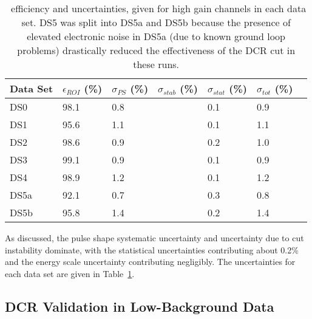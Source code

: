 \begin{table}[]
\centering
\begin{tabular}{l l l l l l l}
Data Set & $\epsilon_{ROI}$ (\%) & $\sigma_{PS}$ (\%) & $\sigma_{stab}$  (\%) & $\sigma_{stat}$  (\%) &$\sigma_{tot}$ (\%) \\ 
\hline
DS0  & 98.1  &  0.8  &    &  0.1  &  0.9 \\   
DS1  & 95.6  &  1.1  &    &  0.1  &  1.1 \\
DS2  & 98.6  &  0.9  &    &  0.2  &  1.0 \\
DS3  & 99.1  &  0.9  &    &  0.1  &  0.9 \\
DS4  & 98.9  &  1.2  &    &  0.1  &  1.2 \\
DS5a  & 92.1  &  0.7  &    &  0.3  &  0.8 \\
DS5b  & 95.8  &  1.4  &    &  0.2  &  1.4 \\
\end{tabular}
 \caption[\nonubb\ efficiency and uncertainties in the \MJ\ \DEM]{\nonubb\ efficiency and uncertainties, given for high gain channels in each data set. DS5 was split into DS5a and DS5b because the presence of elevated electronic noise in DS5a (due to known ground loop problems) drastically reduced the effectiveness of the DCR cut in these runs.} 
 \label{tab:DS_efficiencies}
\end{table}

As discussed, the pulse shape systematic uncertainty and uncertainty due to cut instability dominate, with the statistical uncertainties contributing about 0.2\% and the energy scale uncertainty contributing negligibly. The uncertainties for each data set are given in Table~\ref{tab:DS_efficiencies}. 

\subsection{DCR Validation in Low-Background Data}

